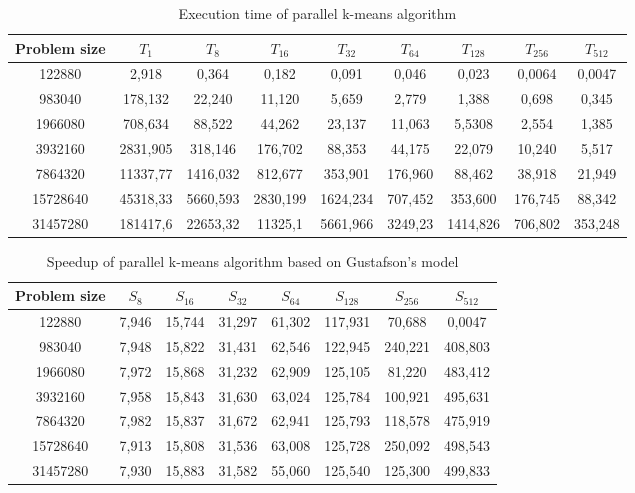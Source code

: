 \documentclass[runningheads]{llncs}
\begin{document}
\begin{table}
\caption{Execution time of parallel k-means algorithm}\label{Tab:tab1}
\centering
\begin{tabular}{|c|c|c|c|c|c|c|c|c|}
\hline
Problem size & $T_1$ & $T_8$ & $T_{16}$ & $T_{32}$ & $T_{64}$ & $T_{128}$ & $T_{256}$ & $T_{512}$\\
\hline
122880 & 2,918 & 0,364 & 0,182 & 0,091 & 0,046 & 0,023 & 0,0064 & 0,0047 \\
\hline
983040 & 178,132 & 22,240 & 11,120 & 5,659 & 2,779 & 1,388 & 0,698 & 0,345 \\
\hline
1966080 & 708,634 & 88,522 & 44,262 & 23,137 & 11,063 & 5,5308 & 2,554 & 1,385 \\
\hline
3932160 & 2831,905 & 318,146 & 176,702 & 88,353 & 44,175 & 22,079 & 10,240 & 5,517 \\
\hline
7864320 & 11337,77 & 1416,032 & 812,677 & 353,901 & 176,960 & 88,462 & 38,918 & 21,949 \\
\hline
15728640 & 45318,33 & 5660,593 & 2830,199 & 1624,234 & 707,452 & 353,600 & 176,745 & 88,342 \\
\hline
31457280 & 181417,6 & 22653,32 & 11325,1 & 5661,966 & 3249,23 & 1414,826 & 706,802 & 353,248 \\
\hline
\end{tabular}
\end{table}

\begin{table}
\caption{Speedup of parallel k-means algorithm based on Gustafson's model}\label{Tab:tab2}
\centering
\begin{tabular}{|c|c|c|c|c|c|c|c|}
\hline
Problem size & $S_8$ & $S_{16}$ & $S_{32}$ & $S_{64}$ & $S_{128}$ & $S_{256}$ & $S_{512}$\\
\hline
122880 & 7,946 & 15,744 & 31,297 & 61,302 & 117,931 & 70,688 & 0,0047 \\
\hline
983040 & 7,948 & 15,822 & 31,431 & 62,546 & 122,945 & 240,221 & 408,803 \\
\hline
1966080 & 7,972 & 15,868 & 31,232 & 62,909 & 125,105 & 81,220 & 483,412 \\
\hline
3932160 & 7,958 & 15,843 & 31,630 & 63,024 & 125,784 & 100,921 & 495,631 \\
\hline
7864320 & 7,982 & 15,837 & 31,672 & 62,941 & 125,793 & 118,578 & 475,919 \\
\hline
15728640 & 7,913 & 15,808 & 31,536 & 63,008 & 125,728 & 250,092 & 498,543 \\
\hline
31457280 & 7,930 & 15,883 & 31,582 & 55,060 & 125,540 & 125,300 & 499,833 \\
\hline
\end{tabular}
\end{table}
\end{document}
